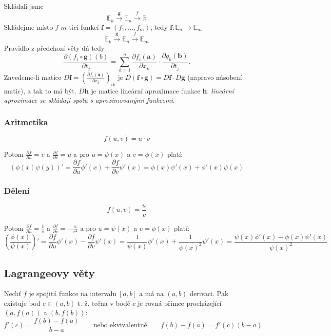 \documentclass[../main.tex]{subfiles}
\begin{document}
Skládali jsme
\[\mathbb{E}_k \xrightarrow{\mathbf{g}} \mathbb{E}_n \xrightarrow{\textit{f}} \mathbb{R} \]
Skládejme místo $f$ $m$-tici funkcí
$\mathbf{f} = (f_1,...,f_m)$, tedy $\mathbf{f}: \mathbb{E}_n \rightarrow \mathbb{E}_m$
\[\mathbb{E}_k \xrightarrow{\mathbf{g}} \mathbb{E}_n \xrightarrow{\textit{f}} \mathbb{E}_m \]
Pravidlo z předchozí věty dá tedy
\[\frac{\partial (f_i \circ \mathbf{g})(b)}{\partial t_j} = \sum^n_{k=1} \frac{\partial f_i(\mathbf{a})}{\partial x_k}
\cdot \frac{\partial g_k(\mathbf{b})}{\partial t_j}.\]
Zavedeme-li matice $D\mathbf{f} = \left(\frac{\partial f_i(\mathbf{a})}{\partial x_k}\right)_{ik}$ je 
$D(\mathbf{f}\circ \mathbf{g}) = D\mathbf{f}\cdot D\mathbf{g}$ (napravo násobení matic), a tak to má být. $D\mathbf{h}$ je matice lineární aproximace 
funkce $\mathbf{h}$: \textit{lineární aproximace se skládají spolu s aproximovanými funkcemi}.
\noindent

\subsubsection{Aritmetika}
\[ f(u,v) = u \cdot v \]

Potom $ \frac{\partial f}{\partial u} = v $ a $ \frac{\partial f}{\partial v} = u $
a pro $u = \psi (x)$ a $ v = \phi (x) $ platí:
\[ (\phi (x) \psi (y))' =
\frac{\partial f}{\partial u} \phi '(x) + \frac{\partial f}{\partial v} \psi '(x) = 
\phi (x)\psi '(x) + \phi '(x)\psi (x)  \]

\subsubsection{Dělení}
\[ f(u,v) = \frac{u}{v} \]

Potom $ \frac{\partial f}{\partial u} = \frac{1}{v} $ a $ \frac{\partial f}{\partial v} = -\frac{u}{v^2} $
a pro $u = \psi (x)$ a $ v = \phi (x) $ platí:
\[ \left( \frac{\phi (x)}{\psi (x)} \right)' =
\frac{\partial f}{\partial u} \phi '(x) - \frac{\partial f}{\partial v} \psi '(x) =
\frac{1}{\psi (x)} \phi '(x) + \frac{1}{\psi (x)^2}\psi '(x) =
\frac{\psi (x)\phi '(x) - \phi (x)\psi '(x)}{\psi (x)^2} \]

\subsection{Lagrangeovy věty}
\begin{theorem}
	Nechť $f$ je spojitá funkce na intervalu $[a, b]$ a má na $(a, b)$ derivaci. Pak existuje bod $c \in (a, b)$ t. ž. tečna v bodě $c$ je rovná přímce procházející $(a, f(a))$ a $(b, f(b))$: $$f'(c) = \frac{f(b) - f(a)}{b - a} \qquad \text{nebo ekvivalentně} \qquad f(b) - f(a) = f'(c)(b - a)$$
\end{theorem}
\end{document}
